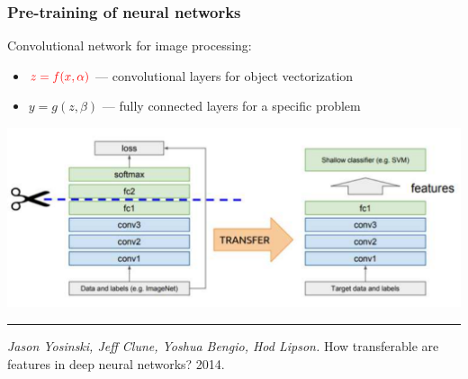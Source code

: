 \documentclass[fullscreen=true, bookmarks=true, hyperref={pdfencoding=unicode}]{beamer}
\begin{document}
\begin{frame}
  \frametitle{Pre-training of neural networks}

    Convolutional network for image processing:

    \begin{itemize}
      \item $\color{red}{z=f(x,\alpha)}$ — convolutional layers for object vectorization
      \item $y = g(z, \beta)$ — fully connected layers for a specific problem
    \end{itemize}

    \begin{center}
      \includegraphics[keepaspectratio,
                       width=.8\paperwidth]{pre-training.png}
    \end{center}

    \noindent\rule{8cm}{0.4pt}

    {\footnotesize
    {\it Jason Yosinski, Jeff Clune, Yoshua Bengio, Hod Lipson.} How transferable are features in deep neural networks? 2014.}
\end{frame}
\end{document}
